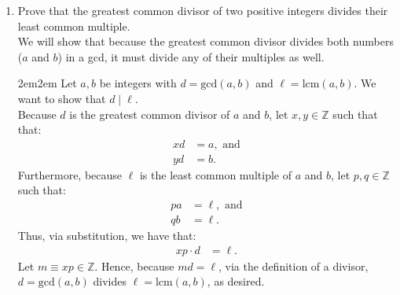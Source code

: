 \documentclass[10pt,oneside]{book}
\newcommand{\Z}{\mathbb{Z}}\newcommand{\R}{\mathbb{R}}\newcommand{\N}{\mathbb{N}}
\newcommand{\gspc}{\vspace{0.13cm}} %
\newcommand{\gline}{\gspc\\} %
\let\endoldproof\endproof
\renewenvironment{proof}[1][\proofname]
  {\vspace{0.2cm}\begin{adjustwidth}{2em}{2em}
   \oldproof[#1]}
  {\endoldproof
   \end{adjustwidth}}
\begin{document}
\begin{enumerate}
\begin{enumerate}
	\end{enumerate}
	\item [9.] Prove that the greatest common divisor of two positive integers divides their least common multiple.\gline
	We will show that because the greatest common divisor divides both numbers ($a$ and $b$) in a gcd, it must divide any of their multiples as well. 
	\begin{proof}
		Let $a, b$ be integers with $d = \text{gcd}(a,b)$ and $\ell = \text{lcm}(a,b)$. We want to show that $d\mid \ell$. \gline
		Because $d$ is the greatest common divisor of $a$ and $b$, let $x, y \in \Z$ such that that:
		\begin{align*}
			xd &= a, \text{ and}\\
			yd &= b.
		\end{align*}
		Furthermore, because $\ell$ is the least common multiple of $a$ and $b$, let $ p,q \in \Z$ such that:
		\begin{align*}
			pa &= \ell, \text{ and} \\
			qb &= \ell.
		\end{align*}
		Thus, via substitution, we have that:
		\begin{align*}
			xp\cdot d &= \ell.
		\end{align*}
		Let $m \equiv xp \in \Z$. Hence, because $md = \ell$, via the definition of a divisor, $d=\text{gcd}(a,b)$ divides $\ell = \text{lcm}(a, b)$, as desired. 
	\end{proof}
\end{enumerate}
\end{document}
